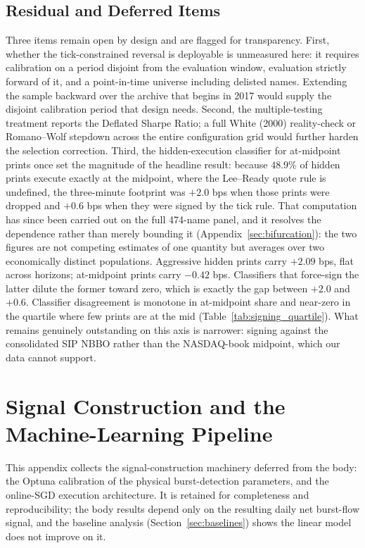 \documentclass[11pt]{article}
\begin{document}
\subsection{Residual and Deferred Items}
Three items remain open by design and are flagged for transparency. First, whether the tick-constrained reversal is deployable is unmeasured here: it requires calibration on a period disjoint from the evaluation window, evaluation strictly forward of it, and a point-in-time universe including delisted names. Extending the sample backward over the archive that begins in 2017 would supply the disjoint calibration period that design needs. Second, the multiple-testing treatment reports the Deflated Sharpe Ratio; a full White (2000) reality-check or Romano--Wolf stepdown across the entire configuration grid would further harden the selection correction. Third, the hidden-execution classifier for at-midpoint prints once set the magnitude of the headline result: because $48.9\%$ of hidden prints execute exactly at the midpoint, where the Lee--Ready quote rule is undefined, the three-minute footprint was $+2.0$ bps when those prints were dropped and $+0.6$ bps when they were signed by the tick rule. That computation has since been carried out on the full 474-name panel, and it resolves the dependence rather than merely bounding it (Appendix~\ref{sec:bifurcation}): the two figures are not competing estimates of one quantity but averages over two economically distinct populations. Aggressive hidden prints carry $+2.09$ bps, flat across horizons; at-midpoint prints carry $-0.42$ bps. Classifiers that force-sign the latter dilute the former toward zero, which is exactly the gap between $+2.0$ and $+0.6$. Classifier disagreement is monotone in at-midpoint share and near-zero in the quartile where few prints are at the mid (Table~\ref{tab:signing_quartile}). What remains genuinely outstanding on this axis is narrower: signing against the consolidated SIP NBBO rather than the NASDAQ-book midpoint, which our data cannot support.

\section{Signal Construction and the Machine-Learning Pipeline}
\label{sec:mlpipeline}
This appendix collects the signal-construction machinery deferred from the body: the Optuna calibration of the physical burst-detection parameters, and the online-SGD execution architecture. It is retained for completeness and reproducibility; the body results depend only on the resulting daily net burst-flow signal, and the baseline analysis (Section~\ref{sec:baselines}) shows the linear model does not improve on it.
\end{document}
